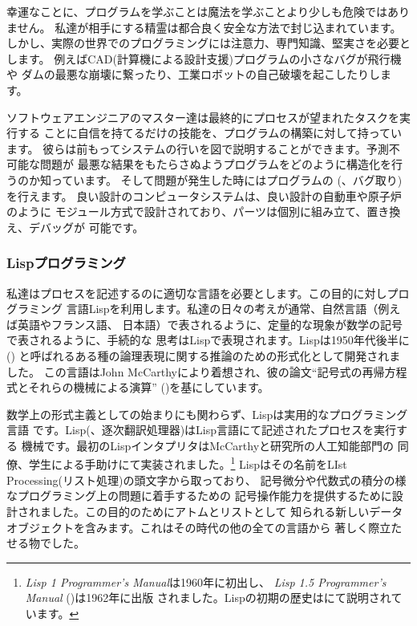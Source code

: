 幸運なことに、プログラムを学ぶことは魔法を学ぶことより少しも危険ではありません。
私達が相手にする精霊は都合良く安全な方法で封じ込まれています。
しかし、実際の世界でのプログラミングには注意力、専門知識、堅実さを必要とします。
例えばCAD(計算機による設計支援)プログラムの小さなバグが飛行機や
ダムの最悪な崩壊に繋ったり、工業ロボットの自己破壊を起こしたりします。



ソフトウェアエンジニアのマスター達は最終的にプロセスが望まれたタスクを実行する
ことに自信を持てるだけの技能を、プログラムの構築に対して持っています。
彼らは前もってシステムの行いを図で説明することができます。予測不可能な問題が
最悪な結果をもたらさぬようプログラムをどのように構造化を行うのか知っています。
そして問題が発生した時にはプログラムの (、バグ取り)を行えます。
良い設計のコンピュータシステムは、良い設計の自動車や原子炉のように
モジュール方式で設計されており、パーツは個別に組み立て、置き換え、デバッグが
可能です。

\subsubsection*{Lispプログラミング}



私達はプロセスを記述するのに適切な言語を必要とします。この目的に対しプログラミング
言語Lispを利用します。私達の日々の考えが通常、自然言語（例えば英語やフランス語、
日本語）で表されるように、定量的な現象が数学の記号で表されるように、手続的な
思考はLispで表現されます。Lispは1950年代後半に()
と呼ばれるある種の論理表現に関する推論のための形式化として開発されました。
この言語はJohn McCarthyにより着想され、彼の論文``記号式の再帰方程式とそれらの機械による演算''
()を基にしています。



数学上の形式主義としての始まりにも関わらず、Lispは実用的なプログラミング言語
です。Lisp(、逐次翻訳処理器)はLisp言語にて記述されたプロセスを実行する
機械です。最初のLispインタプリタはMcCarthyと研究所の人工知能部門の
同僚、学生による手助けにて実装されました。\footnote{
\textit{Lisp 1 Programmer's Manual}は1960年に初出し、
\textit{Lisp 1.5 Programmer's Manual} ()は1962年に出版
されました。Lispの初期の歴史はにて説明されています。}
Lispはその名前をLIst Processing(リスト処理)の頭文字から取っており、
記号微分や代数式の積分の様なプログラミング上の問題に着手するための
記号操作能力を提供するために設計されました。この目的のためにアトムとリストとして
知られる新しいデータオブジェクトを含みます。これはその時代の他の全ての言語から
著しく際立たせる物でした。



